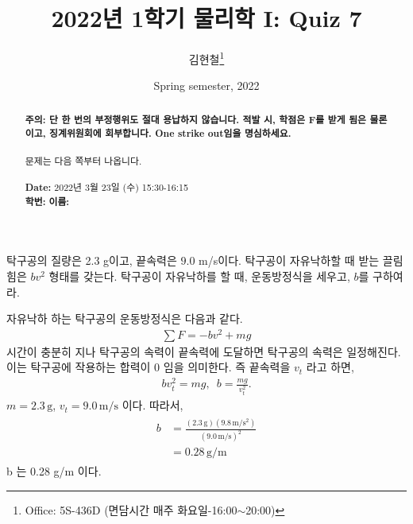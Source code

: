 \documentclass[floatfix,nofootinbib,superscriptaddress,fleqn,preprint]{revtex4}
\begin{document}
\title{\Large 2022년 1학기 물리학 I: Quiz 7}
\author{김현철\footnote{Office: 5S-436D (면담시간 매주
    화요일-16:00$\sim$20:00)}} 
\date{Spring semester, 2022}


\vspace{1.cm}
\begin{abstract}
\noindent \textbf{ {\color{red}주의}: \color{blue} 단 한 번의 부정행위도 절대
  용납하지 않습니다. 적발 시, 학점은 F를 받게 됨은 물론이고,
  징계위원회에 회부합니다. One strike out임을 명심하세요.}\\
\\
문제는 다음 쪽부터 나옵니다.  \\ \\
{\bf Date:} 2022년 3월 23일 (수) 15:30-16:15 
\\
{\bf 학번:} \hspace{4cm}
{\bf 이름:} 

\end{abstract}
\maketitle

탁구공의 질량은 2.3 g이고, 끝속력은 $9.0$ m/s이다. 탁구공이 자유낙하할
때 받는 끌림힘은 $bv^2$ 형태를 갖는다. 탁구공이 자유낙하를 할 때,
운동방정식을 세우고, $b$를 구하여라.  


자유낙하 하는 탁구공의 운동방정식은 다음과 같다.
\begin{align}
  \sum F = -bv^2+mg
\end{align}
시간이 충분히 지나 탁구공의 속력이 끝속력에 도달하면 탁구공의 속력은 
일정해진다. 이는 탁구공에 작용하는 합력이 0 임을 의미한다. 즉 끝속력을
$v_t$ 라고 하면,
\begin{align}
  bv_t^2 = mg,\,\,\, b =\frac{mg}{v_t^2}.
\end{align}
$m = 2.3\,\mathrm{g}$, $v_t = 9.0\,\mathrm{m/s}$ 이다. 따라서,
\begin{align}
  \begin{split}
    b &= \frac{(2.3\,\mathrm{g})(9.8\,\mathrm{m/s^2})}{( 9.0\,\mathrm{m/s})^2}  \\
    &= 0.28\,\mathrm{g/m}
  \end{split}
  \end{align}
  b 는 0.28 g/m 이다.
\vspace{1.cm}
\end{document}
